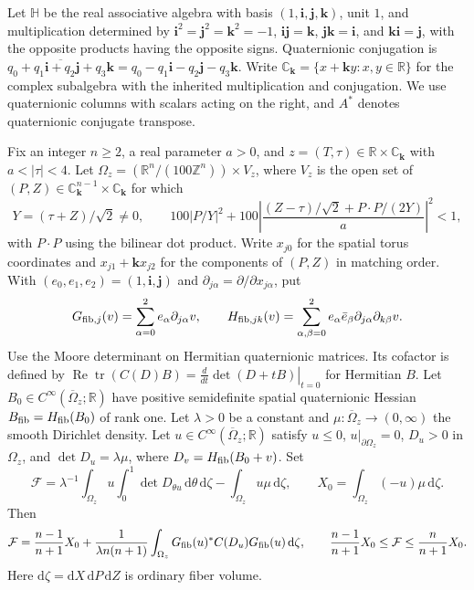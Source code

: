 Let $\mathbb H$ be the real associative algebra with basis $(1,\mathbf i,\mathbf j,\mathbf k)$, unit $1$, and multiplication determined by
$\mathbf i^2=\mathbf j^2=\mathbf k^2=-1$, $\mathbf i\mathbf j=\mathbf k$, $\mathbf j\mathbf k=\mathbf i$, and $\mathbf k\mathbf i=\mathbf j$, with the opposite products having the opposite signs. Quaternionic conjugation is
$\overline{q_0+q_1\mathbf i+q_2\mathbf j+q_3\mathbf k}=q_0-q_1\mathbf i-q_2\mathbf j-q_3\mathbf k$.
Write $\mathbb C_{\mathbf k}=\{x+\mathbf k y:x,y\in\mathbb R\}$ for the complex subalgebra with the inherited multiplication and conjugation. We use quaternionic columns with scalars acting on the right, and $A^*$ denotes quaternionic conjugate transpose.

Fix an integer $n\ge2$, a real parameter $a>0$, and $z=(T,\tau)\in\mathbb R\times\mathbb C_{\mathbf k}$ with $a<|\tau|<4$. Let $\Omega_z=(\mathbb R^n/(100\mathbb Z^n))\times V_z$, where $V_z$ is the open set of $(P,Z)\in\mathbb C_{\mathbf k}^{n-1}\times\mathbb C_{\mathbf k}$ for which
\[
 Y=(\tau+Z)/\sqrt2\ne0,\qquad
 100\left|P/Y\right|^2+100\left|\frac{(Z-\tau)/\sqrt2+P\cdot P/(2Y)}{a}\right|^2<1,
\]
with $P\cdot P$ using the bilinear dot product. Write $x_{j0}$ for the spatial torus coordinates and $x_{j1}+\mathbf k x_{j2}$ for the components of $(P,Z)$ in matching order. With $(e_0,e_1,e_2)=(1,\mathbf i,\mathbf j)$ and $\partial_{j\alpha}=\partial/\partial x_{j\alpha}$, put
\[
G_{{\rm fib},j}(v)=\sum_{\alpha=0}^2e_\alpha\partial_{j\alpha}v,\qquad
H_{{\rm fib},jk}(v)=\sum_{\alpha,\beta=0}^2 e_\alpha\bar e_\beta
      \partial_{j\alpha}\partial_{k\beta}v .
\]
Use the Moore determinant on Hermitian quaternionic matrices. Its cofactor is defined by
$\operatorname{Re}\operatorname{tr}(C(D)B)=\left.\frac{d}{dt}\det(D+tB)\right|_{t=0}$
for Hermitian $B$. Let $B_0\in C^\infty(\overline\Omega_z;\mathbb R)$ have positive semidefinite spatial quaternionic Hessian $B_{\rm fib}=H_{\rm fib}(B_0)$ of rank one. Let $\lambda>0$ be a constant and $\mu:\overline\Omega_z\to(0,\infty)$ the smooth Dirichlet density. Let $u\in C^\infty(\overline\Omega_z;\mathbb R)$ satisfy $u\le0$, $u|_{\partial\Omega_z}=0$, $D_u>0$ in $\Omega_z$, and $\det D_u=\lambda\mu$, where $D_v=H_{\rm fib}(B_0+v)$. Set
\[
 \mathcal F=\lambda^{-1}\int_{\Omega_z}u\int_0^1\det D_{\theta u}\,\mathrm d\theta\,\mathrm d\zeta
  -\int_{\Omega_z}u\mu\,\mathrm d\zeta,
 \qquad X_0=\int_{\Omega_z}(-u)\mu\,\mathrm d\zeta.
\]
Then
\[
 \mathcal F=\frac{n-1}{n+1}X_0+\frac{1}{\lambda n(n+1)}
 \int_{\Omega_z} G_{\rm fib}(u)^* C(D_u)G_{\rm fib}(u)\,\mathrm d\zeta,
 \qquad
 \frac{n-1}{n+1}X_0\le\mathcal F\le\frac n{n+1}X_0.
\]
Here $\mathrm d\zeta=\mathrm dX\,\mathrm dP\,\mathrm dZ$ is ordinary fiber volume.
